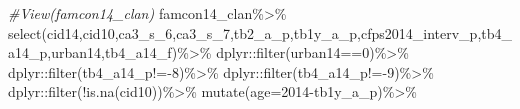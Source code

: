 \documentclass[
  oneside]{book}
\newenvironment{Shaded}{\begin{snugshade}}{\end{snugshade}}
\newcommand{\AttributeTok}[1]{\textcolor[rgb]{0.77,0.63,0.00}{#1}}
\newcommand{\CommentTok}[1]{\textcolor[rgb]{0.56,0.35,0.01}{\textit{#1}}}
\newcommand{\DecValTok}[1]{\textcolor[rgb]{0.00,0.00,0.81}{#1}}
\newcommand{\FunctionTok}[1]{\textcolor[rgb]{0.00,0.00,0.00}{#1}}
\newcommand{\NormalTok}[1]{#1}
\newcommand{\SpecialCharTok}[1]{\textcolor[rgb]{0.00,0.00,0.00}{#1}}
\begin{document}
\begin{Shaded}
\begin{Highlighting}[]
\CommentTok{\#View(famcon14\_clan)}
\NormalTok{famcon14\_clan}\SpecialCharTok{\%\textgreater{}\%}
  \FunctionTok{select}\NormalTok{(cid14,cid10,ca3\_s\_6,ca3\_s\_7,tb2\_a\_p,tb1y\_a\_p,cfps2014\_interv\_p,tb4\_a14\_p,urban14,tb4\_a14\_f)}\SpecialCharTok{\%\textgreater{}\%}
\NormalTok{  dplyr}\SpecialCharTok{::}\FunctionTok{filter}\NormalTok{(urban14}\SpecialCharTok{==}\DecValTok{0}\NormalTok{)}\SpecialCharTok{\%\textgreater{}\%}
\NormalTok{  dplyr}\SpecialCharTok{::}\FunctionTok{filter}\NormalTok{(tb4\_a14\_p}\SpecialCharTok{!={-}}\DecValTok{8}\NormalTok{)}\SpecialCharTok{\%\textgreater{}\%}
\NormalTok{  dplyr}\SpecialCharTok{::}\FunctionTok{filter}\NormalTok{(tb4\_a14\_p}\SpecialCharTok{!={-}}\DecValTok{9}\NormalTok{)}\SpecialCharTok{\%\textgreater{}\%}
\NormalTok{  dplyr}\SpecialCharTok{::}\FunctionTok{filter}\NormalTok{(}\SpecialCharTok{!}\FunctionTok{is.na}\NormalTok{(cid10))}\SpecialCharTok{\%\textgreater{}\%}
  \FunctionTok{mutate}\NormalTok{(}\AttributeTok{age=}\DecValTok{2014}\SpecialCharTok{{-}}\NormalTok{tb1y\_a\_p)}\SpecialCharTok{\%\textgreater{}\%}
  

\end{Highlighting}
\end{Shaded}
\end{document}
